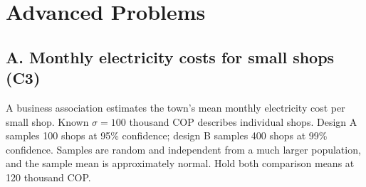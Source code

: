 \section{Advanced Problems}\label{sec:advanced}
\subsection{A. Monthly electricity costs for small shops (C3)}\label{prob:c3-3}
A business association estimates the town's mean monthly electricity cost per small shop. Known $\sigma=100$ thousand COP describes individual shops. Design A samples 100 shops at 95\% confidence; design B samples 400 shops at 99\% confidence. Samples are random and independent from a much larger population, and the sample mean is approximately normal. Hold both comparison means at 120 thousand COP.
